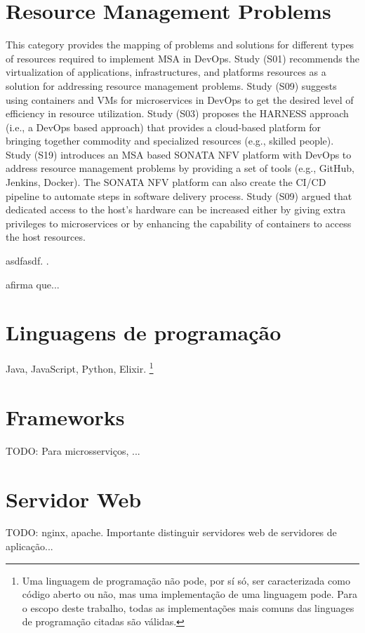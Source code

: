 \section{Resource Management Problems}
This category provides the mapping of problems and solutions for different types of resources required to implement MSA in DevOps. Study (S01) recommends the virtualization of applications, infrastructures, and platforms resources as a solution for addressing resource management problems. Study (S09) suggests using containers and VMs for microservices in DevOps to get the desired level of efficiency in resource utilization. Study (S03) proposes the HARNESS approach (i.e., a DevOps based approach) that provides a cloud-based platform for bringing together commodity and specialized resources (e.g., skilled people). Study (S19) introduces an MSA based SONATA NFV platform with DevOps to address resource management problems by providing a set of tools (e.g., GitHub, Jenkins, Docker). The SONATA NFV platform can also create the CI/CD pipeline to automate steps in software delivery process. Study (S09) argued that dedicated access to the host’s hardware can be increased either by giving extra privileges to microservices or by enhancing the capability of containers to access the host resources.

asdfasdf. \cite{Tanembaum-Steen}.

 afirma que...


\section{Linguagens de programação}
Java, JavaScript, Python, Elixir. \footnote{Uma linguagem de programação não pode, por sí só, ser caracterizada como código aberto ou não, mas uma implementação de uma linguagem pode. Para o escopo deste trabalho, todas as implementações mais comuns das linguages de programação citadas são válidas.}


\section{Frameworks}
TODO: Para microsserviços, ...

\section{Servidor Web}
TODO: nginx, apache. 
Importante distinguir servidores web de servidores de aplicação...

